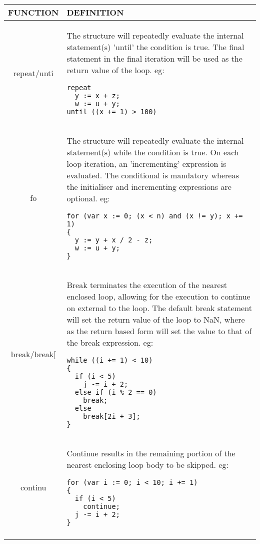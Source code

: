 \begin{tabular}{|c|p{}|}
\hline 
FUNCTION & DEFINITION\tabularnewline
\hline 
repeat/unti & The structure will repeatedly evaluate the internal statement(s) 'until'
the condition is true. The final statement in the final iteration
will be used as the return value of the loop. eg: 
\begin{verbatim}
repeat                                               
  y := x + z;                                        
  w := u + y;                                        
until ((x += 1) > 100)                               
\end{verbatim}
\tabularnewline
fo & The structure will repeatedly evaluate the internal statement(s) while
the condition is true. On each loop iteration, an 'incrementing' expression
is evaluated. The conditional is mandatory whereas the initialiser
and incrementing expressions are optional. eg: 
\begin{verbatim}
for (var x := 0; (x < n) and (x != y); x += 1)        
{                                                     
  y := y + x / 2 - z;                                 
  w := u + y;                                         
}            
\end{verbatim}
\tabularnewline
break/break{[} & Break terminates the execution of the nearest enclosed loop, allowing
for the execution to continue on external to the loop. The default
break statement will set the return value of the loop to NaN, where
as the return based form will set the value to that of the break expression.
eg: 
\begin{verbatim}
while ((i += 1) < 10)                                   
{                                                       
  if (i < 5)                                            
    j -= i + 2;                                         
  else if (i % 2 == 0)                                  
    break;                                              
  else                                                  
    break[2i + 3];                                      
}            
\end{verbatim}
\tabularnewline
continu & Continue results in the remaining portion of the nearest enclosing
loop body to be skipped. eg: 
\begin{verbatim}
for (var i := 0; i < 10; i += 1)  
{                                 
  if (i < 5)                      
    continue;                     
  j -= i + 2;                     
}            
\end{verbatim}
\tabularnewline
\hline 
 & \tabularnewline
\end{tabular}

